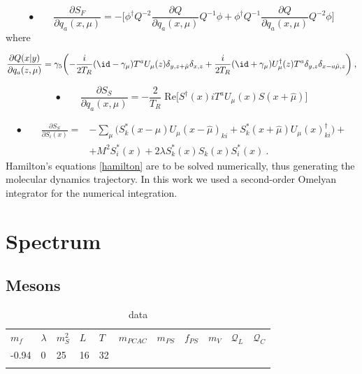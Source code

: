 \begin{equation}
\bullet \qquad\frac{\partial S_F}{\partial q_a(x,\mu)} =   -\biggl[ \phi^{\dagger} Q^{-2}\frac{\partial Q}{\partial q_a(x,\mu)} Q^{-1} \phi + \phi^{\dagger} Q^{-1} \frac{\partial Q}{\partial q_a(x,\mu)} Q^{-2} \phi \biggr] 
\end{equation}
%
where

\begin{equation}
\frac{\partial Q(x \vert y)}{\partial q_a(z,\mu)} = \gamma_5 \biggl( -\frac{i}{2T_R} (\id - \gamma_{\mu}) T^a U_{\mu}(z) \delta_{y,z+\hat\mu} \delta_{x,z} +\frac{i}{2T_R}(\id + \gamma_{\mu}) U_{\mu}^{\dagger}(z) T^a \delta_{y,z} \delta_{x-a\hat\mu,z} \biggr) \: ,
\end{equation}


\begin{equation}
\bullet \qquad
\frac{\partial S_S}{\partial q_a(x,\mu)} = - \frac{2}{T_R} \; \mathrm{Re} \biggl[ S^{\dagger}(x) i T^a U_{\mu}(x) S(x+\hat\mu) \biggr] 
\end{equation}



\begin{equation}
\begin{split}
\bullet \qquad
\frac{\partial S_S}{\partial S_i(x)} = & - \sum_{\mu} \biggl( S^*_k(x-\hat \mu) U_{\mu}(x-\hat\mu)_{ki} + S^*_k(x+\hat\mu) U_{\mu}(x)^{\dagger}_{ki} \biggr) +  \\
& + M^2 S_i^*(x) + 2 \lambda S_k^*(x) S_k(x) S_i^*(x) \: .
\end{split}
\end{equation}
%
Hamilton's equations \ref{hamilton} are to be solved numerically, thus generating the molecular dynamics trajectory. In this work we used a second-order Omelyan integrator \cite{PhysRevE.65.056706,OMELYAN2003272} for the numerical integration.




\section{Spectrum}

\subsection{Mesons}

\begin{table}
\begin{tabular}{l  l l l l l l l l l l}
\toprule
$m_f$ & $\lambda$ & $m_S^2$ & $L$ & $T$ & $m_{PCAC}$ & $m_{PS}$ & $f_{PS}$ & $m_V$ & $\mathcal Q_L$ & $\mathcal Q_C$ \\ 
\hhline{===========}
-0.94 & 0 & 25 & 16 & 32 \\
\bottomrule
\label{data}
\end{tabular}
\caption{data}
\label{data}
\end{table}

